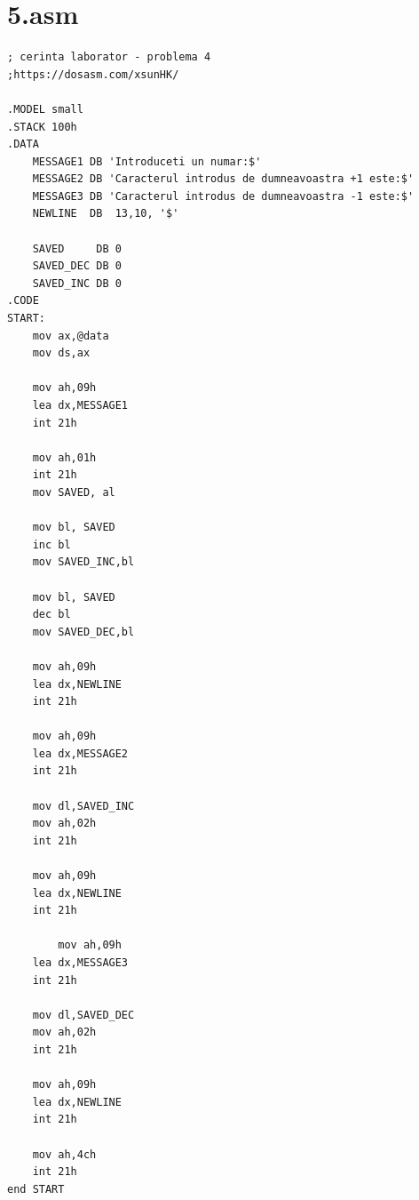 \documentclass{article}
\begin{document}
\section*{5.asm}
\begin{lstlisting}
; cerinta laborator - problema 4
;https://dosasm.com/xsunHK/

.MODEL small
.STACK 100h
.DATA
    MESSAGE1 DB 'Introduceti un numar:$'
    MESSAGE2 DB 'Caracterul introdus de dumneavoastra +1 este:$' 
    MESSAGE3 DB 'Caracterul introdus de dumneavoastra -1 este:$' 
    NEWLINE  DB  13,10, '$'
    
    SAVED     DB 0
    SAVED_DEC DB 0
    SAVED_INC DB 0
.CODE
START:
    mov ax,@data
    mov ds,ax

    mov ah,09h
    lea dx,MESSAGE1
    int 21h
    
    mov ah,01h
    int 21h
    mov SAVED, al
    
    mov bl, SAVED
    inc bl
    mov SAVED_INC,bl
    
    mov bl, SAVED
    dec bl
    mov SAVED_DEC,bl
    
    mov ah,09h
    lea dx,NEWLINE
    int 21h
    
    mov ah,09h
    lea dx,MESSAGE2
    int 21h
    
    mov dl,SAVED_INC
    mov ah,02h
    int 21h
    
    mov ah,09h
    lea dx,NEWLINE
    int 21h
    
        mov ah,09h
    lea dx,MESSAGE3
    int 21h
    
    mov dl,SAVED_DEC
    mov ah,02h
    int 21h
    
    mov ah,09h
    lea dx,NEWLINE
    int 21h
    
    mov ah,4ch
    int 21h
end START
\end{lstlisting}
\newpage
\end{document}

